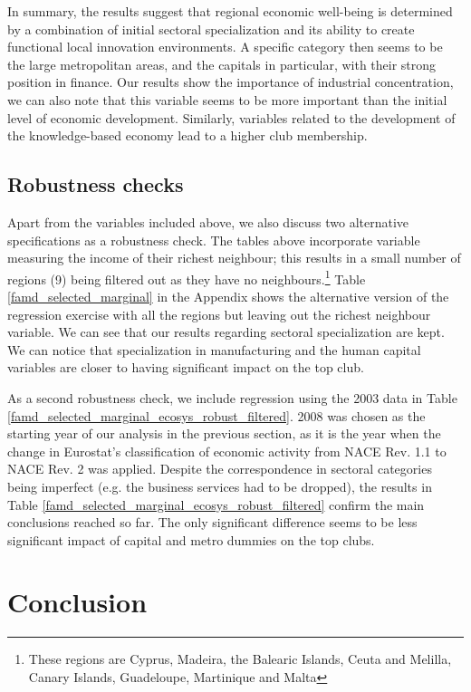 \documentclass[11pt]{article}
\begin{document}
In summary, the results suggest that regional economic well-being is determined by a combination of initial sectoral specialization and its ability to create functional local innovation environments. A specific category then seems to be the large metropolitan areas, and the capitals in particular, with their strong position in finance. Our results show the importance of industrial concentration, we can also note that this variable seems to be more important than the initial level of economic development. Similarly, variables related to the development of the knowledge-based economy lead to a higher club membership.

\subsection{Robustness checks}
Apart from the variables included above, we also discuss two alternative specifications as a robustness check. The tables above incorporate variable measuring the income of their richest neighbour; this results in a small number of regions (9) being filtered out as they have no neighbours.\footnote{These regions are Cyprus, Madeira, the Balearic Islands, Ceuta and Melilla, Canary Islands, Guadeloupe, Martinique and Malta} Table \ref{famd_selected_marginal} in the Appendix shows the alternative version of the regression exercise with all the regions but leaving out the richest neighbour variable. We can see that our results regarding sectoral specialization are kept. We can notice that specialization in manufacturing and the human capital variables are closer to having significant impact on the top club.

As a second robustness check, we include regression using the 2003 data in Table \ref{famd_selected_marginal_ecosys_robust_filtered}.  2008 was chosen as the starting year of our analysis in the previous section, as it is the year when the change in Eurostat's classification of economic activity from NACE Rev. 1.1 to NACE Rev. 2 was applied.  Despite the correspondence in sectoral categories being imperfect (e.g. the business services had to be dropped), the results in Table \ref{famd_selected_marginal_ecosys_robust_filtered} confirm the main conclusions reached so far. The only significant difference seems to be less significant impact of capital and metro dummies on the top clubs.

\section{Conclusion}
\end{document}

